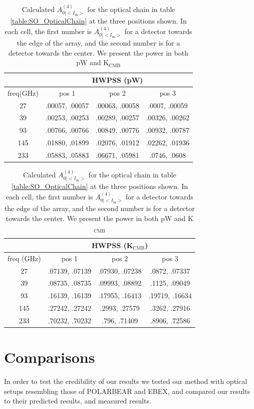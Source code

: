 \documentclass{article}
\theoremstyle{remark}
\newcommand{\tab}{\hspace*{2em}}
\renewcommand{\t}[1]{\text{#1}}
\newcommand{\AI}{A^{(4)}_{0|<I_{\t{in}}>}}
\begin{document}
\begin{table}
\centering

\begin{tabular}{ |c|c|c|c| } 
	\hline
	 & \multicolumn{3}{|c|}{HWPSS (pW)}\\
	\hline
	freq(GHz) & pos 1 	& pos 2 & pos 3 \\ \hline
	27  & .00057, .00057 & .00063, .00058 & .0007, .00059 \\
	39  & .00253, .00253 & .00289, .00257 & .00326, .00262	 \\
	93  & .00766, .00766 & .00849, .00776 & .00932, .00787 	 \\
	145 & .01880, .01899  & .02076, .01912   & .02262, .01936 	 \\
	233 & .05883, .05883   & .06671, .05981   & .0746, .0608 	 \\
	\hline	
\end{tabular}


\begin{tabular}{ |c|c|c|c| } 
	\hline
	 & \multicolumn{3}{|c|}{HWPSS (K$_\t{CMB}$)}\\
	\hline
	freq (GHz) & pos 1 	& pos 2 & pos 3 \\ \hline
	27  & .07139, .07139 	 & .07930, .07238 & .0872, .07337 \\
	39  & .08735, .08735 & .09993, .08892 & .1125, .09049	 \\
	93  & .16139, .16139 & .17955, .16413 & .19719, .16634 	 \\
	145 & .27242, .27242  & .2993, .27579   & .3262, .27916 	 \\
	233 & .70232, .70232   & .796, .71409   & .8906, .72586 	 \\
	\hline	
\end{tabular}


\caption{ Calculated $\AI$ for the optical chain in table \ref{table:SO_OpticalChain} at the three positions shown.
In each cell, the first number is $\AI$ for a detector towards the edge of the array, and the second number 
is for a detector towards the center. We present the power in both pW and K$_\t{CMB}$
}
\label{table:SO_powers}
\end{table}




\section*{Comparisons}

\tab In order to test the credibility of our results we tested our method with optical setups resembling those of POLARBEAR and EBEX,
and compared our results to their predicted results, and measured results. 
\end{document}
